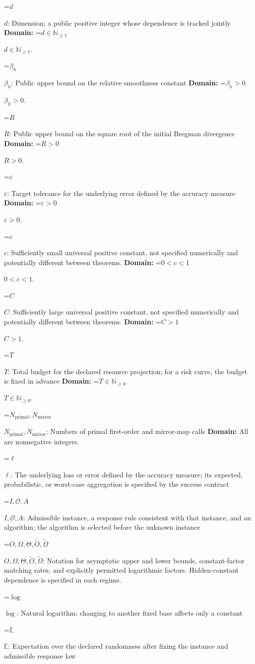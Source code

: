\documentclass[10pt,a4paper]{article}
\newcommand{\AtlasMath}[1]{\par\begingroup\centering\setbox0=\hbox{$\displaystyle #1$}\ifdim\wd0>1.4\linewidth\typeout{ATLAS WIDE FORMULA: \the\wd0}\fi\ifdim\wd0>\linewidth\resizebox{\linewidth}{!}{\box0}\else\box0\fi\par\endgroup}
\newcommand{\AtlasInlineMath}[1]{\begingroup\setbox0=\hbox{$#1$}\ifdim\wd0>.4\linewidth\endgroup\AtlasMath{#1}\else\endgroup$#1$\fi}
\begin{document}
\AtlasInlineMath{d}: Dimension; a public positive integer whose dependence is tracked jointly \textbf{Domain:} \AtlasInlineMath{d\in\mathbb{N}_{\ge1}}.

\AtlasInlineMath{\beta_h}: Public upper bound on the relative smoothness constant \textbf{Domain:} \AtlasInlineMath{\beta_h>0}.

\AtlasInlineMath{R}: Public upper bound on the square root of the initial Bregman divergence \textbf{Domain:} \AtlasInlineMath{R>0}.

\AtlasInlineMath{\varepsilon}: Target tolerance for the underlying error defined by the accuracy measure \textbf{Domain:} \AtlasInlineMath{\varepsilon>0}.

\AtlasInlineMath{c}: Sufficiently small universal positive constant, not specified numerically and potentially different between theorems. \textbf{Domain:} \AtlasInlineMath{0<c<1}.

\AtlasInlineMath{C}: Sufficiently large universal positive constant, not specified numerically and potentially different between theorems. \textbf{Domain:} \AtlasInlineMath{C>1}.

\AtlasInlineMath{T}: Total budget for the declared resource projection; for a risk curve, the budget is fixed in advance \textbf{Domain:} \AtlasInlineMath{T\in\mathbb{N}_{\ge0}}.

\AtlasInlineMath{N_{\mathrm{primal}},N_{\mathrm{mirror}}}: Numbers of primal first-order and mirror-map calls \textbf{Domain:} All are nonnegative integers.

\AtlasInlineMath{\ell}: The underlying loss or error defined by the accuracy measure; its expected, probabilistic, or worst-case aggregation is specified by the success contract

\AtlasInlineMath{I,\mathcal{O},A}: Admissible instance, a response rule consistent with that instance, and an algorithm; the algorithm is selected before the unknown instance

\AtlasInlineMath{O,\Omega,\Theta,\widetilde{O},\widetilde\Omega}: Notation for asymptotic upper and lower bounds, constant-factor matching rates, and explicitly permitted logarithmic factors. Hidden-constant dependence is specified in each regime.

\AtlasInlineMath{\log}: Natural logarithm; changing to another fixed base affects only a constant

\AtlasInlineMath{\mathbb{E}}: Expectation over the declared randomness after fixing the instance and admissible response law
\end{document}
